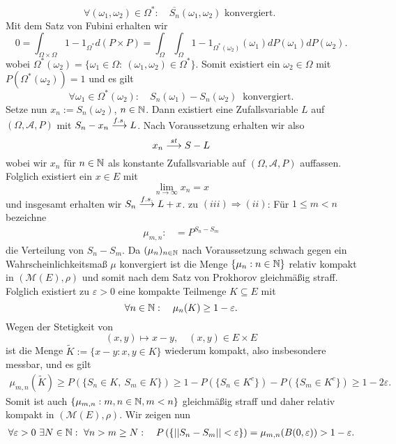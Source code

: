 \begin{proof*}
    $$  
        \forall (\omega_1, \omega_2) \in \Omega^*: \quad \overline{S_n}(\omega_1, \omega_2) \text{ konvergiert. }
    $$
    Mit dem Satz von Fubini erhalten wir
    $$
        0 = \int_{\Omega \times \Omega}1 - 1_{\Omega^*} d(P \times P) = \int_{\Omega}\int_{\Omega}1 - 1_{\Omega^*(\omega_2)}(\omega_1)dP(\omega_1)dP(\omega_2). 
    $$
    wobei $\Omega^*(\omega_2) =\{\omega_1\in\Omega: \ (\omega_1, \omega_2) \in \Omega^* \}$. Somit existiert ein $\omega_2 \in \Omega$ mit $P(\Omega^*(\omega_2)) = 1$ und es gilt
    $$
        \forall \omega_1 \in \Omega^*(\omega_2): \quad S_n(\omega_1) - S_n(\omega_2) \ \text{ konvergiert.}
    $$
    Setze nun $x_n := S_n(\omega_2)$, $n \in \mathbb{N}$. Dann existiert eine Zufallsvariable $L$ auf $(\Omega, \mathcal{A}, P)$ mit $S_n - x_n \overset{f.s.}{\longrightarrow} L$. Nach Voraussetzung erhalten wir also 
    $$
        x_n \overset{st}{\longrightarrow} S - L
    $$
    wobei wir $x_n$ für $n \in \mathbb{N}$ als konstante Zufallsvariable auf $(\Omega, \mathcal{A}, P)$ auffassen. Folglich existiert ein $x \in E$ mit 
    $$
        \lim_{n \to \infty}x_n = x
    $$
    und insgesamt erhalten wir $S_n \overset{f.s.}{\longrightarrow} L + x$. 
    \newline 
    zu $(iii) \Rightarrow (ii)$: Für $1 \leq m < n$ bezeichne
    \begin{align*}
        \mu_{m,n} :&= P^{S_n - S_m}
    \end{align*}
    die Verteilung von $S_n - S_m$. Da $(\mu_n)_{n \in \mathbb{N}}$ nach Voraussetzung schwach gegen ein Wahrscheinlichkeitsmaß $\mu$ konvergiert
    ist die Menge $\{\mu_n: n \in \mathbb{N} \}$ relativ kompakt in $(\mathcal{M}(E), \rho)$ und somit nach dem Satz von Prokhorov gleichmäßig straff.
    Folglich existiert zu $\varepsilon > 0$ eine kompakte Teilmenge $K \subseteq E$ mit 
    $$
        \forall n \in \mathbb{N}: \quad \mu_n(K) \geq 1 - \varepsilon. 
    $$
    Wegen der Stetigkeit von 
    $$
        (x,y) \mapsto x - y, \quad (x,y) \in E \times E
    $$
    ist die Menge $\tilde{K} := \{x - y : x,y \in K \}$ wiederum kompakt, also insbesondere messbar, und es gilt
    \begin{align*}
        \mu_{m,n}(\tilde{K}) \geq P(\{S_n \in K, \ S_m \in K\}) \geq 1 - P(\{S_n \in K^c\}) - P(\{S_m \in K^c\}) \geq 1 - 2\varepsilon.
    \end{align*}
    Somit ist auch $\{\mu_{m,n}: m,n \in \mathbb{N}, m < n \}$ gleichmäßig straff und daher relativ kompakt in $(\mathcal{M}(E), \rho)$. 
    Wir zeigen nun
    \begin{align}
        \forall \varepsilon > 0 \ \exists N \in \N: \ \forall n > m \geq N: \quad \prob{\norm{S_n - S_m} < \varepsilon} = \mu_{m,n}(B(0,\varepsilon)) > 1 - \varepsilon.

\end{align}
\end{proof*}
